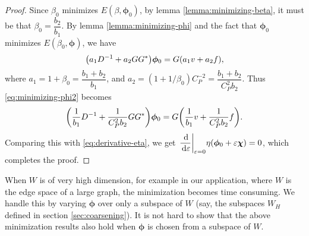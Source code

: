 \documentclass[ ]{elsarticle}
\newcommand{\Grad}{G}
\newcommand{\Div}{G^*}
\newcommand{\esp}{W}
\newcommand{\dif}{\,\mathrm d}
\let\originalleft\left
\let\originalright\right
\renewcommand{\left}{\mathopen{}\mathclose\bgroup\originalleft}
\renewcommand{\right}{\aftergroup\egroup\originalright}
\numberwithin{equation}{section}
\begin{document}
\begin{proof}
  Since $\beta_0$ minimizes $E(\beta,\bm\phi_0)$, by lemma
  \ref{lemma:minimizing-beta}, it must be that
  $\beta_0 = \dfrac{b_2}{b_1}$. By lemma \ref{lemma:minimizing-phi}
  and the fact that $\bm\phi_0$ minimizes $E(\beta_0,\bm\phi)$, we
  have
  \begin{equation}\label{eq:minimizing-phi2}
    \left(a_1D^{-1}+a_2\Grad\Div\right)\bm\phi_0 = \Grad(a_1v+a_2f),
  \end{equation}
  where $a_1 = 1+\beta_0 = \dfrac{b_1+b_2}{b_1}$, and
  $a_2 = (1+1/\beta_0)C_P^{-2} = \dfrac{b_1+b_2}{C_P^2b_2}$. Thus
  \eqref{eq:minimizing-phi2} becomes
  \begin{equation*}
    \left(\frac{1}{b_1}D^{-1}+\frac{1}{C_P^2b_2}\Grad\Div\right)\bm\phi_0
    = \Grad\left(\frac{1}{b_1}v+\frac{1}{C_P^2b_2}f\right).
  \end{equation*}
  Comparing this with \eqref{eq:derivative-eta}, we get
  $\displaystyle\left.\frac{\dif}{\dif\varepsilon}\right\vert_{\varepsilon=0}
  \eta(\bm\phi_0+\varepsilon\bm\chi) = 0$, which completes the proof.
\end{proof}

When $\esp$ is of very high dimension, for example in our application,
where $\esp$ is the edge space of a large graph, the minimization
becomes time consuming. We handle this by varying $\bm\phi$ over only
a subspace of $\esp$ (say, the subspaces $W_H$ defined in section
\ref{sec:coarsening}). It is not hard to show that the above
minimization results also hold when $\bm\phi$ is chosen from a
subspace of $\esp$.
\end{document}
